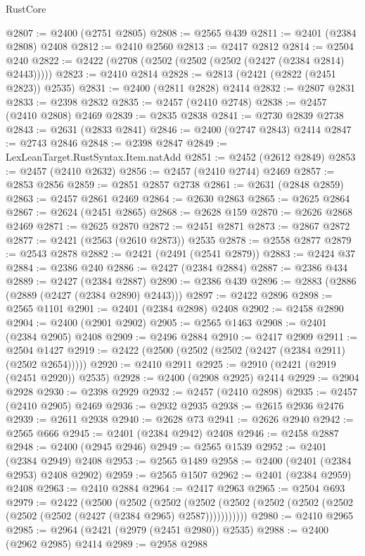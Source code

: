 \begin{lexlean}{RustCore}
\begin{coremodule}
@2807 := @2400 (@2751 @2805)
@2808 := @2565 @439
@2811 := @2401 (@2384 @2808) @2408
@2812 := @2410 @2560
@2813 := @2417 @2812
@2814 := @2504 @240
@2822 := @2422 (@2708 (@2502 (@2502 (@2502 (@2427 (@2384 @2814) @2443)))))
@2823 := @2410 @2814
@2828 := @2813 (@2421 (@2822 (@2451 @2823)) @2535)
@2831 := @2400 (@2811 @2828) @2414
@2832 := @2807 @2831
@2833 := @2398 @2832
@2835 := @2457 (@2410 @2748)
@2838 := @2457 (@2410 @2808) @2469
@2839 := @2835 @2838
@2841 := @2730 @2839 @2738
@2843 := @2631 (@2833 @2841)
@2846 := @2400 (@2747 @2843) @2414
@2847 := @2743 @2846
@2848 := @2398 @2847
@2849 := LexLeanTarget.RustSyntax.Item.natAdd
@2851 := @2452 (@2612 @2849)
@2853 := @2457 (@2410 @2632)
@2856 := @2457 (@2410 @2744) @2469
@2857 := @2853 @2856
@2859 := @2851 @2857 @2738
@2861 := @2631 (@2848 @2859)
@2863 := @2457 @2861 @2469
@2864 := @2630 @2863
@2865 := @2625 @2864
@2867 := @2624 (@2451 @2865)
@2868 := @2628 @159
@2870 := @2626 @2868 @2469
@2871 := @2625 @2870
@2872 := @2451 @2871
@2873 := @2867 @2872
@2877 := @2421 (@2563 (@2610 @2873)) @2535
@2878 := @2558 @2877
@2879 := @2543 @2878
@2882 := @2421 (@2491 (@2541 @2879))
@2883 := @2424 @37
@2884 := @2386 @240
@2886 := @2427 (@2384 @2884)
@2887 := @2386 @434
@2889 := @2427 (@2384 @2887)
@2890 := @2386 @439
@2896 := @2883 (@2886 (@2889 (@2427 (@2384 @2890) @2443)))
@2897 := @2422 @2896
@2898 := @2565 @1101
@2901 := @2401 (@2384 @2898) @2408
@2902 := @2458 @2890
@2904 := @2400 (@2901 @2902)
@2905 := @2565 @1463
@2908 := @2401 (@2384 @2905) @2408
@2909 := @2496 @2884
@2910 := @2417 @2909
@2911 := @2504 @1427
@2919 := @2422 (@2500 (@2502 (@2502 (@2427 (@2384 @2911) (@2502 @2654)))))
@2920 := @2410 @2911
@2925 := @2910 (@2421 (@2919 (@2451 @2920)) @2535)
@2928 := @2400 (@2908 @2925) @2414
@2929 := @2904 @2928
@2930 := @2398 @2929
@2932 := @2457 (@2410 @2898)
@2935 := @2457 (@2410 @2905) @2469
@2936 := @2932 @2935
@2938 := @2615 @2936 @2476
@2939 := @2611 @2938
@2940 := @2628 @73
@2941 := @2626 @2940
@2942 := @2565 @666
@2945 := @2401 (@2384 @2942) @2408
@2946 := @2458 @2887
@2948 := @2400 (@2945 @2946)
@2949 := @2565 @1539
@2952 := @2401 (@2384 @2949) @2408
@2953 := @2565 @1489
@2958 := @2400 (@2401 (@2384 @2953) @2408 @2902)
@2959 := @2565 @1507
@2962 := @2401 (@2384 @2959) @2408
@2963 := @2410 @2884
@2964 := @2417 @2963
@2965 := @2504 @693
@2979 := @2422
    (@2500
      (@2502
        (@2502
          (@2502 (@2502 (@2502 (@2502 (@2502 (@2502 (@2502 (@2427 (@2384 @2965) @2587)))))))))))
@2980 := @2410 @2965
@2985 := @2964 (@2421 (@2979 (@2451 @2980)) @2535)
@2988 := @2400 (@2962 @2985) @2414
@2989 := @2958 @2988

\end{coremodule}
\end{lexlean}
